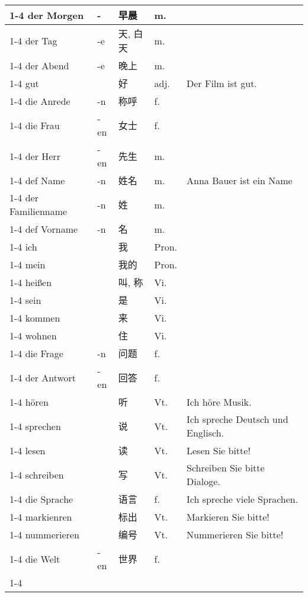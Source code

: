 \documentclass[hidelinks]{ctexart}
\newcommand{\gvocabcline}{\cline{1-4}}
\begin{document}
\begin{longtable}{lllll}
    \gvocabcline
    der Morgen & - & 早晨 & m. \\
    \gvocabcline
    der Tag & -e & 天, 白天 & m. \\
    \gvocabcline
    der Abend & -e & 晚上 & m. \\
    \gvocabcline
    gut & & 好 & adj. & Der Film ist gut. \\
    \gvocabcline
    die Anrede & -n & 称呼 & f. \\
    \gvocabcline
    die Frau & -en & 女士 & f. \\
    \gvocabcline
    der Herr & -en & 先生 & m. \\
    \gvocabcline
    def Name & -n & 姓名 & m. & Anna Bauer ist ein Name \\
    \gvocabcline
    der Familienname & -n & 姓 & m. \\
    \gvocabcline
    def Vorname & -n & 名 & m. \\
    \gvocabcline
    ich & & 我 & Pron. \\
    \gvocabcline
    mein & & 我的 & Pron. \\
    \gvocabcline
    hei\ss en & & 叫, 称 & Vi. \\
    \gvocabcline
    sein & & 是 & Vi. \\
    \gvocabcline
    kommen & & 来 & Vi.\\
    \gvocabcline
    wohnen & & 住 & Vi.\\
    \gvocabcline
    die Frage & -n & 问题 & f.\\
    \gvocabcline
    der Antwort & -en & 回答 & f.\\
    \gvocabcline
    h\"oren & & 听 & Vt. & Ich h\"ore Musik. \\
    \gvocabcline
    sprechen & & 说 & Vt. & Ich spreche Deutsch und Englisch. \\
    \gvocabcline
    lesen & & 读 & Vt. & Lesen Sie bitte! \\
    \gvocabcline
    schreiben & & 写 & Vt. & Schreiben Sie bitte Dialoge.\\
    \gvocabcline
    die Sprache & & 语言 & f. & Ich spreche viele Sprachen. \\
    \gvocabcline
    markienren & & 标出 & Vt. & Markieren Sie bitte! \\
    \gvocabcline
    nummerieren & & 编号 & Vt. & Nummerieren Sie bitte! \\
    \gvocabcline
    die Welt & -en & 世界 & f. \\
    \gvocabcline

\end{longtable}
\end{document}
